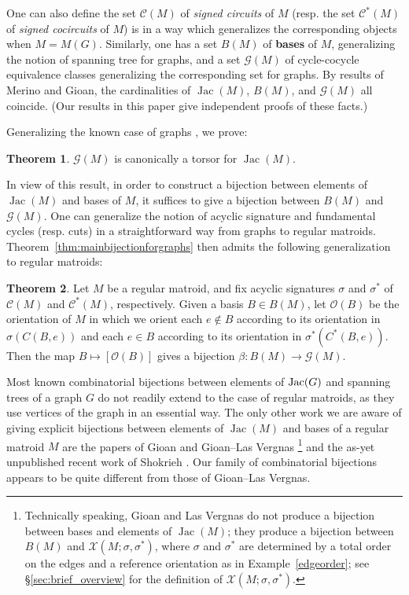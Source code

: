 \documentclass[12pt]{amsart}
\numberwithin{equation}{section}
\theoremstyle{definition}
\newtheorem{theorem}{Theorem}[subsection]
\newcommand{\Jac}{\operatorname{Jac}}
\begin{document}
One can also define the set ${\mathcal C}(M)$ of {\em signed circuits} of $M$ (resp. the set ${\mathcal C}^*(M)$ of {\em signed cocircuits} of $M$) is in a way which generalizes the corresponding objects when $M=M(G)$.  Similarly, one has a set $B(M)$ of {\bf bases} of $M$, generalizing the notion of spanning tree for graphs, and a set ${\mathcal G}(M)$ of cycle-cocycle equivalence classes generalizing the corresponding set for graphs. By results of Merino and Gioan, the cardinalities of $\Jac(M)$, $B(M)$, and ${\mathcal G}(M)$ all coincide. (Our results in this paper give independent proofs of these facts.)

Generalizing the known case of graphs \cite{backman2014riemann}, we prove:

\begin{theorem} \label{thm:torsortheorem}
${\mathcal G}(M)$ is canonically a torsor for $\Jac(M)$.
\end{theorem}


In view of this result, in order to construct a bijection between elements of $\Jac(M)$ and bases of $M$, it suffices to give a bijection between $B(M)$ and ${\mathcal G}(M)$.
One can generalize the notion of acyclic signature and fundamental cycles (resp. cuts) in a straightforward way from graphs to regular matroids. 
Theorem~\ref{thm:mainbijectionforgraphs} then admits the following generalization to regular matroids:


\begin{theorem} \label{thm:mainbijectionforregularmatroids}
Let $M$ be a regular matroid, and fix acyclic signatures $\sigma$ and $\sigma^*$ of ${\mathcal C}(M)$ and ${\mathcal C}^*(M)$, respectively. Given a basis $B \in B(M)$, let ${\mathcal O}(B)$ be the orientation of $M$ in which we orient each $e \not\in B$ according to its orientation in $\sigma(C(B,e))$ and each $e \in B$ according to its orientation in $\sigma^*(C^*(B,e))$. Then the map $B \mapsto [{\mathcal O}(B)]$ gives a bijection $\beta : B(M) \to {\mathcal G}(M)$. 
\end{theorem}



\medskip

Most known combinatorial bijections between elements of ${\rm Jac}(G)$ and spanning trees of a graph $G$ do not readily extend to the case of regular matroids, as they use vertices of the graph in an essential way.
The only other work we are aware of giving explicit bijections between elements of $\Jac(M)$ and bases of a regular matroid $M$ are the papers of Gioan and Gioan--Las Vergnas \cite{gioan2002correspond,gioan2005activity}\footnote{Technically speaking, Gioan and Las Vergnas do not produce a bijection between bases and elements of $\Jac(M)$; they produce a bijection between $B(M)$ and $\mathcal{X}(M;\sigma,\sigma^*)$, where $\sigma$ and $\sigma^*$ are determined by a total order on the edges and a reference orientation as in Example~\ref{edgeorder}; see \S\ref{sec:brief_overview} for the definition of $\mathcal{X}(M;\sigma,\sigma^*)$.} and the as-yet unpublished recent work of Shokrieh \cite{farbod2016draft}. Our family of combinatorial bijections appears to be quite different from those of Gioan--Las Vergnas. 
\end{document}
